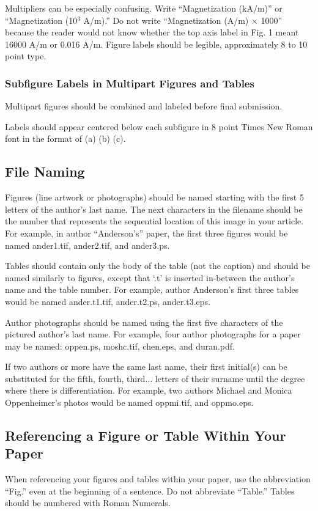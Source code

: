 \documentclass[journal,twoside,web]{ieeecolor2}
\begin{document}
Multipliers can be especially confusing.
Write ``Magnetization (kA/m)'' or 
``Magnetization (10$^{3}$ A/m).'' Do not write ``Magnetization 
(A/m)$\,\times\,$1000'' because the reader would not know whether the top 
axis label in Fig.
1 meant 16000 A/m or 0.016 A/m.
Figure labels should be 
legible, approximately 8 to 10 point type.

\subsubsection{Subfigure Labels in Multipart Figures and Tables}
Multipart figures should be combined and labeled before final submission.

Labels should appear centered below each subfigure in 8 point Times New 
Roman font in the format of (a) (b) (c).


\subsection{File Naming}
Figures (line artwork or photographs) should be named starting with the 
first 5 letters of the author's last name.
The next characters in the 
filename should be the number that represents the sequential 
location of this image in your article.
For example, in author 
``Anderson's'' paper, the first three figures would be named ander1.tif, 
ander2.tif, and ander3.ps.

Tables should contain only the body of the table (not the caption) and 
should be named similarly to figures, except that `.t' is inserted 
in-between the author's name and the table number.
For example, author 
Anderson's first three tables would be named ander.t1.tif, ander.t2.ps, 
ander.t3.eps.

Author photographs should be named using the first five characters of the 
pictured author's last name.
For example, four author photographs for a 
paper may be named: oppen.ps, moshc.tif, chen.eps, and duran.pdf.

If two authors or more have the same last name, their first initial(s) can 
be substituted for the fifth, fourth, third$\ldots$ letters of their surname 
until the degree where there is differentiation.
For example, two authors 
Michael and Monica Oppenheimer's photos would be named oppmi.tif, and 
oppmo.eps.

\subsection{Referencing a Figure or Table Within Your Paper}
When referencing your figures and tables within your paper, use the 
abbreviation ``Fig.'' even at the beginning of a sentence.
Do not abbreviate 
``Table.'' Tables should be numbered with Roman Numerals.
\end{document}
